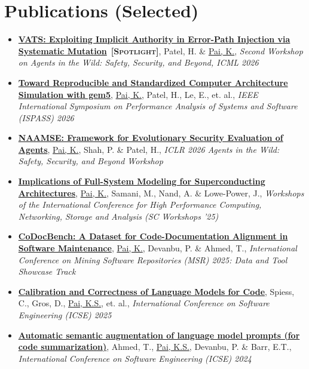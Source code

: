 \documentclass[letterpaper,10pt]{article}
\newcommand{\resumeItem}[1]{\item\small{#1} \vspace{-3pt}}
\begin{document}
\section{Publications (Selected)}
{\normalsize
\begin{itemize}[leftmargin=0.15in, label={}, itemsep=0pt]
  \resumeItem{\href{https://arxiv.org/pdf/2606.07992}{\textbf{VATS: Exploiting Implicit Authority in Error-Path Injection via Systematic Mutation}} \,\textbf{\textsc{[Spotlight]}}, Patel, H. \& \underline{Pai, K.}, \textit{Second Workshop on Agents in the Wild: Safety, Security, and Beyond, ICML 2026}}
  \resumeItem{\href{https://doi.org/10.1109/ISPASS69572.2026.00027}{\textbf{Toward Reproducible and Standardized Computer Architecture Simulation with gem5}}, \underline{Pai, K.}, Patel, H., Le, E., et. al., \textit{IEEE International Symposium on Performance Analysis of Systems and Software (ISPASS) 2026}}
  \resumeItem{\href{https://openreview.net/pdf?id=RhoRECtymK}{\textbf{NAAMSE: Framework for Evolutionary Security Evaluation of Agents}}, \underline{Pai, K.}, Shah, P. \& Patel, H., \textit{ICLR 2026 Agents in the Wild: Safety, Security, and Beyond Workshop}}
  \resumeItem{\href{https://doi.org/10.1145/3731599.3769278}{\textbf{Implications of Full-System Modeling for Superconducting Architectures}}, \underline{Pai, K.}, Samani, M., Nand, A. \& Lowe-Power, J., \textit{Workshops of the International Conference for High Performance Computing, Networking, Storage and Analysis (SC Workshops '25)}}
  \resumeItem{\href{https://doi.org/10.1109/MSR66628.2025.00077}{\textbf{CoDocBench: A Dataset for Code-Documentation Alignment in Software Maintenance}}, \underline{Pai, K.}, Devanbu, P. \& Ahmed, T., \textit{International Conference on Mining Software Repositories (MSR) 2025: Data and Tool Showcase Track}}
  \resumeItem{\href{https://doi.org/10.1109/ICSE55347.2025.00040}{\textbf{Calibration and Correctness of Language Models for Code}}, Spiess, C., Gros, D., \underline{Pai, K.S.}, et. al., \textit{International Conference on Software Engineering (ICSE) 2025}}
  \resumeItem{\href{https://dl.acm.org/doi/pdf/10.1145/3597503.3639183}{\textbf{Automatic semantic augmentation of language model prompts (for code summarization)}}, Ahmed, T., \underline{Pai, K.S.}, Devanbu, P. \& Barr, E.T., \textit{International Conference on Software Engineering (ICSE) 2024}}
\end{itemize}
}
\end{document}
